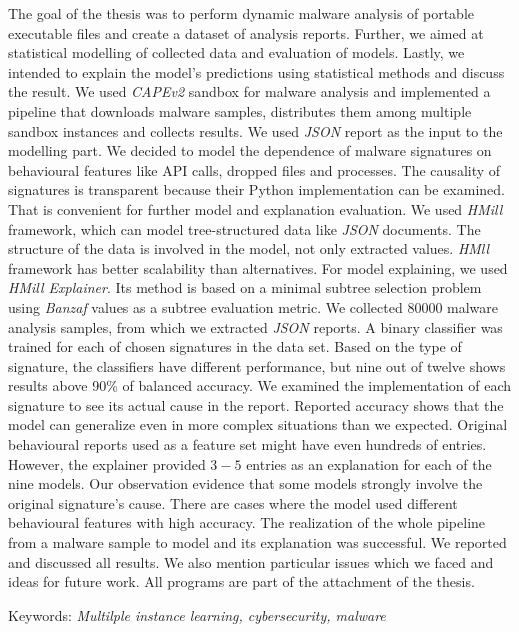 \documentclass[11pt,twoside,a4paper]{book}
\begin{document}
	\abstractpage
The goal of the thesis was to perform dynamic malware analysis of portable executable files and create a dataset of analysis reports. Further, we aimed at statistical modelling of collected data and evaluation of models. Lastly, we intended to explain the model's predictions using statistical methods and discuss the result. We used \emph{CAPEv2} sandbox for malware analysis and implemented a pipeline that downloads malware samples, distributes them among multiple sandbox instances and collects results. We used \emph{JSON} report as the input to the modelling part. We decided to model the dependence of malware signatures on behavioural features like API calls, dropped files and processes. The causality of signatures is transparent because their Python implementation can be examined. That is convenient for further model and explanation evaluation. We used \emph{HMill} framework, which can model tree-structured data like \emph{JSON} documents. The structure of the data is involved in the model, not only extracted values. \emph{HMll} framework has better scalability than alternatives. For model explaining, we used \emph{HMill Explainer}. Its method is based on a minimal subtree selection problem using \emph{Banzaf} values as a subtree evaluation metric. We collected $80000$ malware analysis samples, from which we extracted \emph{JSON} reports. A binary classifier was trained for each of chosen signatures in the data set. Based on the type of signature, the classifiers have different performance, but nine out of twelve shows results above 90\% of balanced accuracy. We examined the implementation of each signature to see its actual cause in the report. Reported accuracy shows that the model can generalize even in more complex situations than we expected. Original behavioural reports used as a feature set might have even hundreds of entries. However, the explainer provided $3-5$ entries as an explanation for each of the nine models. Our observation evidence that some models strongly involve the original signature's cause. There are cases where the model used different behavioural features with high accuracy. The realization of the whole pipeline from a malware sample to model and its explanation was successful. We reported and discussed all results. We also mention particular issues which we faced and ideas for future work. All programs are part of the attachment of the thesis. \
	
	\vspace{5mm}

	\noindent Keywords: \emph{Multilple instance learning, cybersecurity, malware}
\end{document}
